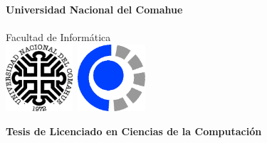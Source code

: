 
\titlepage

\begin{center}
\ \\
\ \\
\vspace{-1cm}
 

\ \\

\vspace{0.5cm}
{\Large{\bf \sc Universidad Nacional del Comahue}}\\

\ \\
{\Large { \sc Facultad de Informática}}\\

\vspace{-2.5cm}
\mbox{\hspace{-1cm}\includegraphics[width=2.5cm,height=2.5cm]{img/unc.png}\hspace{13cm} \includegraphics[width=2.5cm,height=2.5cm]{img/fai.png}}


\vspace{6cm}

{\Large {\bf\sc Tesis de Licenciado en Ciencias de la Computación}}\\
\ \\
\ \\



\end{center}
